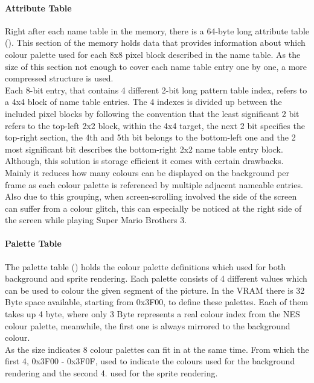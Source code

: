 \documentclass[]{report}
\begin{document}
\paragraph{Attribute Table}
Right after each name table in the memory, there is a 64-byte long attribute table (\cite{ATRT}). This section of the memory holds data that provides information about which colour palette used for each 8x8 pixel block described in the name table. As the size of this section not enough to cover each name table entry one by one, a more compressed structure is used.
\\
Each 8-bit entry, that contains 4 different 2-bit long pattern table index, refers to a 4x4 block of name table entries. The 4 indexes is divided up between the included pixel blocks by following the convention that the least significant 2 bit refers to the top-left 2x2 block, within the 4x4 target, the next 2 bit specifies the top-right section, the 4th and 5th bit belongs to the bottom-left one and the 2 most significant bit describes the bottom-right 2x2 name table entry block.
\\
Although, this solution is storage efficient it comes with certain drawbacks. Mainly it reduces how many colours can be displayed on the background per frame as each colour palette is referenced by multiple adjacent nameable entries. Also due to this grouping, when screen-scrolling involved the side of the screen can suffer from a colour glitch, this can especially be noticed at the right side of the screen while playing Super Mario Brothers 3.

\paragraph{Palette Table}
The palette table (\cite{PLTT}) holds the colour palette definitions which used for both background and sprite rendering. Each palette consists of 4 different values which can be used to colour the given segment of the picture. In the VRAM there is 32 Byte space available, starting from 0x3F00, to define these palettes. Each of them takes up 4 byte, where only 3 Byte represents a real colour index from the NES colour palette, meanwhile, the first one is always mirrored to the background colour. 
\\
As the size indicates 8 colour palettes can fit in at the same time. From which the first 4, 0x3F00 - 0x3F0F, used to indicate the colours used for the background rendering and the second 4. used for the sprite rendering.
\end{document}
